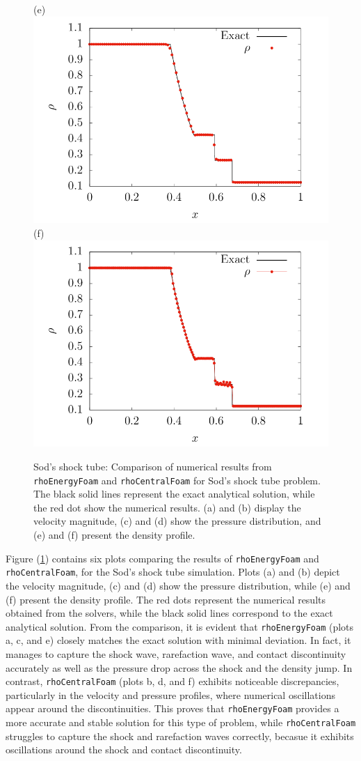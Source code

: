 \documentclass[a5paper]{sapthesis}
\begin{document}
\begin{figure}
		(e)\includegraphics[width=0.45\linewidth]{Figures/Sod_rho_ref}
		(f)\includegraphics[width=0.45\linewidth]{Figures/Sod_rho_rcf}\\
		\caption[Velocity magnitude, Pressure and denisty plots for the Sod's shock tube case.]{Sod's shock tube: Comparison of numerical results from \texttt{rhoEnergyFoam} and \texttt{rhoCentralFoam} for Sod's shock tube problem. The black solid lines represent the exact analytical solution, while the red dot show the numerical results. (a) and (b) display the velocity magnitude, (c) and (d) show the pressure distribution, and (e) and (f) present the density profile.}
		\label{Sod_plots}
	\end{figure}  

	\noindent Figure (\ref{Sod_plots}) contains six plots comparing the results of \texttt{rhoEnergyFoam} and \texttt{rhoCentralFoam}, for the Sod's shock tube simulation. Plots (a) and (b) depict the velocity magnitude, (c) and (d) show the pressure distribution, while (e) and (f) present the density profile. The red dots represent the numerical results obtained from the solvers, while the black solid lines correspond to the exact analytical solution. From the comparison, it is evident that \texttt{rhoEnergyFoam} (plots a, c, and e) closely matches the exact solution with minimal deviation. In fact, it manages to capture the shock wave, rarefaction wave, and contact discontinuity accurately as well as the pressure drop across the shock and the density jump. In contrast, \texttt{rhoCentralFoam} (plots b, d, and f) exhibits noticeable discrepancies, particularly in the velocity and pressure profiles, where numerical oscillations appear around the discontinuities. This proves that \texttt{rhoEnergyFoam} provides a more accurate and stable solution for this type of problem, while \texttt{rhoCentralFoam} struggles to capture the shock and rarefaction waves correctly, becasue it exhibits oscillations around the shock and contact discontinuity.
	
\end{document}
